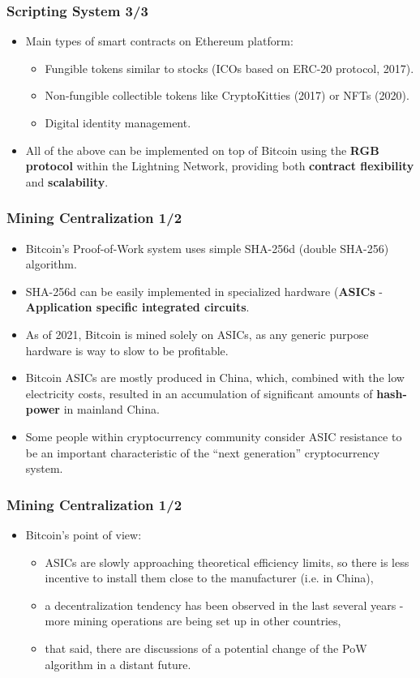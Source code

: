 \documentclass{beamer}
\begin{document}
\begin{frame}
  \frametitle{Scripting System 3/3}
  \begin{itemize}
  \item Main types of smart contracts on Ethereum platform:
    \begin{itemize}
    \item Fungible tokens similar to stocks (ICOs based on ERC-20 protocol,
      2017).
    \item Non-fungible collectible tokens like CryptoKitties (2017) or NFTs
      (2020).
    \item Digital identity management.
    \end{itemize}
  \item All of the above can be implemented on top of Bitcoin using the
    \textbf{RGB protocol} within the Lightning Network, providing both
    \textbf{contract flexibility} and \textbf{scalability}.
  \end{itemize}
\end{frame}

\begin{frame}
  \frametitle{Mining Centralization 1/2}
  \begin{itemize}
  \item Bitcoin's Proof-of-Work system uses simple SHA-256d (double SHA-256)
    algorithm.
  \item SHA-256d can be easily implemented in specialized hardware
    (\textbf{ASICs} - \textbf{Application specific integrated circuits}.
  \item As of 2021, Bitcoin is mined solely on ASICs, as any generic purpose
    hardware is way to slow to be profitable.
  \item Bitcoin ASICs are mostly produced in China, which, combined with the low
    electricity costs, resulted in an accumulation of significant amounts of
    \textbf{hash-power} in mainland China.
  \item Some people within cryptocurrency community consider ASIC resistance to
    be an important characteristic of the ``next generation'' cryptocurrency
    system.
  \end{itemize}
\end{frame}

\begin{frame}
  \frametitle{Mining Centralization 1/2}
  \begin{itemize}
  \item Bitcoin's point of view:
    \begin{itemize}
    \item ASICs are slowly approaching theoretical efficiency limits, so there
      is less incentive to install them close to the manufacturer (i.e. in
      China),
    \item a decentralization tendency has been observed in the last several
      years - more mining operations are being set up in other countries,
    \item that said, there are discussions of a potential change of the PoW
      algorithm in a distant future.
    \end{itemize}
  \end{itemize}
\end{frame}
\end{document}
